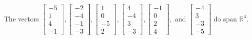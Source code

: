 \begin{exercise}
\begin{exerciseStatement}
  \end{exerciseStatement}
  \begin{exerciseAnswer}
   The vectors \(\left[\begin{array}{r}
-5 \\
1 \\
4 \\
-1
\end{array}\right] , \left[\begin{array}{r}
-2 \\
-4 \\
-1 \\
-3
\end{array}\right] , \left[\begin{array}{r}
1 \\
0 \\
-5 \\
2
\end{array}\right] , \left[\begin{array}{r}
4 \\
-4 \\
3 \\
-3
\end{array}\right] , \left[\begin{array}{r}
-1 \\
0 \\
2 \\
4
\end{array}\right] , \text{ and } \left[\begin{array}{r}
-4 \\
3 \\
-3 \\
-5
\end{array}\right]\) 
  	 do  
	span \(\mathbb{R}^4\).
  


  \end{exerciseAnswer}
\end{exercise}